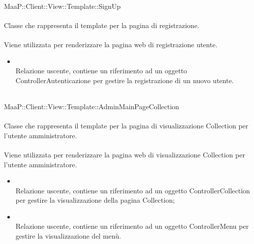 	\\
	MaaP::Client::View::Template::SignUp\\
	\\
	Classe che rappresenta il template per la pagina di registrazione.\\
	\\
	Viene utilizzata per renderizzare la pagina web di registrazione utente.
	\begin{itemize}
	\item{}\\
	Relazione uscente, contiene un riferimento ad un oggetto ControllerAutenticazione per gestire la registrazione di un nuovo utente.
	\end{itemize}

	\\
	MaaP::Client::View::Template::AdminMainPageCollection\\
	\\
	Classe che rappresenta il template per la pagina di visualizzazione Collection per l'utente amministratore.\\
	\\
	Viene utilizzata per renderizzare la pagina web di visualizzazione Collection per l'utente amministratore.\\
	\begin{itemize}
	\item{}\\
	Relazione uscente, contiene un riferimento ad un oggetto ControllerCollection per gestire la visualizzazione della pagina Collection;
	\item{}\\
	Relazione uscente, contiene un riferimento ad un oggetto ControllerMenu per gestire la visualizzazione del menù.
	\end{itemize}
	
